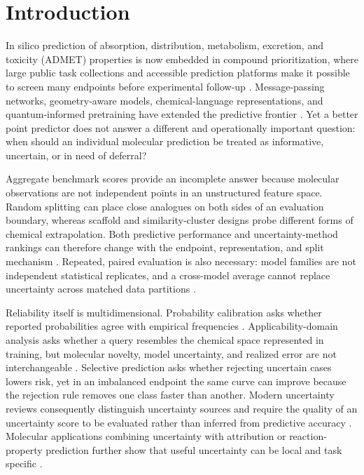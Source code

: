 \section{Introduction}
\label{sec:introduction}

In silico prediction of absorption, distribution, metabolism, excretion, and toxicity (ADMET) properties is now embedded in compound prioritization, where large public task collections and accessible prediction platforms make it possible to screen many endpoints before experimental follow-up \citep{xiong2021admetlab,wei2022interpretable,tian2022admetboost,zhang2022helix,swanson2024admetai,huang2021tdc}. Message-passing networks, geometry-aware models, chemical-language representations, and quantum-informed pretraining have extended the predictive frontier \citep{heid2024chemprop,fang2022geometry,oliveira2022grammar,kim2024quantum}. Yet a better point predictor does not answer a different and operationally important question: when should an individual molecular prediction be treated as informative, uncertain, or in need of deferral?

Aggregate benchmark scores provide an incomplete answer because molecular observations are not independent points in an unstructured feature space. Random splitting can place close analogues on both sides of an evaluation boundary, whereas scaffold and similarity-cluster designs probe different forms of chemical extrapolation. Both predictive performance and uncertainty-method rankings can therefore change with the endpoint, representation, and split mechanism \citep{hirschfeld2020molecularuq,scalia2020gnnuq,lanini2024unique,koetter2025upgrading,tang2025polymeruq,parrondo2026shifts}. Repeated, paired evaluation is also necessary: model families are not independent statistical replicates, and a cross-model average cannot replace uncertainty across matched data partitions \citep{ash2025comparison}.

Reliability itself is multidimensional. Probability calibration asks whether reported probabilities agree with empirical frequencies \citep{guo2017calibration}. Applicability-domain analysis asks whether a query resembles the chemical space represented in training, but molecular novelty, model uncertainty, and realized error are not interchangeable \citep{kim2025distance,koetter2025upgrading}. Selective prediction asks whether rejecting uncertain cases lowers risk, yet in an imbalanced endpoint the same curve can improve because the rejection rule removes one class faster than another. Modern uncertainty reviews consequently distinguish uncertainty sources and require the quality of an uncertainty score to be evaluated rather than inferred from predictive accuracy \citep{hullermeier2021aleatoric,gawlikowski2023survey}. Molecular applications combining uncertainty with attribution or reaction-property prediction further show that useful uncertainty can be local and task specific \citep{komissarov2025explainable,liu2024reactionuq,jiang2024gnas}.

